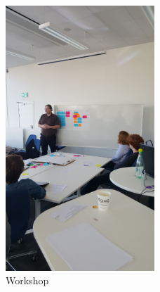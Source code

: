\begin{figure}[hb]
    \centering
    \includegraphics[width=0.5\textwidth, angle=270, origin=c]{img/workshop3.jpg}
    \caption{Workshop}
    \label{fig:workshop3}
\end{figure}

